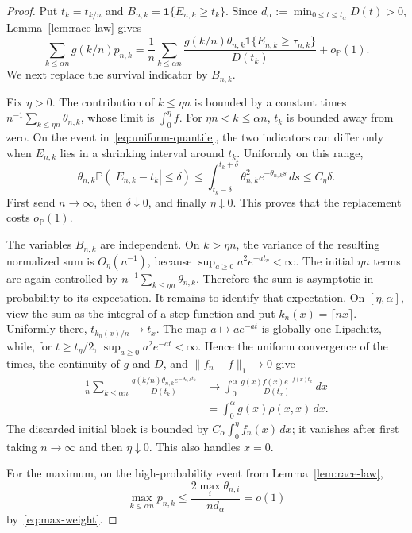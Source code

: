 \documentclass[11pt]{article}
\theoremstyle{remark}
\theoremstyle{plain}
\newcommand{\Pp}{\mathbb P}
\newcommand{\one}{\mathbf 1}
\begin{document}
\begin{proof}
Put $t_k=t_{k/n}$ and $B_{n,k}=\one\{E_{n,k}\ge t_k\}$.  Since
$d_\alpha:=\min_{0\le t\le t_\alpha}D(t)>0$, Lemma~\ref{lem:race-law} gives
\begin{equation}\label{eq:p-first-approx}
 \sum_{k\le\alpha n}g(k/n)p_{n,k}
 =\frac1n\sum_{k\le\alpha n}
 \frac{g(k/n)\theta_{n,k}\one\{E_{n,k}\ge\tau_{n,k}\}}
 {D(t_k)}+o_{\Pp}(1).
\end{equation}
We next replace the survival indicator by $B_{n,k}$.

Fix $\eta>0$.  The contribution of $k\le\eta n$ is bounded by a constant
times $n^{-1}\sum_{k\le\eta n}\theta_{n,k}$, whose limit is
$\int_0^\eta f$.  For $\eta n<k\le\alpha n$, $t_k$ is bounded away from zero.
On the event in~\eqref{eq:uniform-quantile}, the two indicators can differ
only when $E_{n,k}$ lies in a shrinking interval around $t_k$.  Uniformly on
this range,
\[
 \theta_{n,k}\Pp(|E_{n,k}-t_k|\le\delta)
 \le\int_{t_k-\delta}^{t_k+\delta}
       \theta_{n,k}^2e^{-\theta_{n,k}s}\,ds
 \le C_\eta\delta.
\]
First send $n\to\infty$, then $\delta\downarrow0$, and finally
$\eta\downarrow0$.  This proves that the replacement costs $o_{\Pp}(1)$.

The variables $B_{n,k}$ are independent.  On $k>\eta n$, the variance of the
resulting normalized sum is $O_\eta(n^{-1})$, because
$\sup_{a\ge0}a^2e^{-a t_\eta}<\infty$.  The initial $\eta n$ terms are again
controlled by $n^{-1}\sum_{k\le\eta n}\theta_{n,k}$.  Therefore the sum is
asymptotic in probability to its expectation.  It remains to identify that
expectation.  On $[\eta,\alpha]$, view the sum as the integral of a step
function and put $k_n(x)=\lceil nx\rceil$.  Uniformly there,
$t_{k_n(x)/n}\to t_x$.  The map $a\mapsto ae^{-at}$ is globally
one-Lipschitz, while, for $t\ge t_\eta/2$,
$\sup_{a\ge0}a^2e^{-at}<\infty$.  Hence the uniform convergence of the times,
the continuity of $g$ and $D$, and $\lVert f_n-f\rVert_1\to0$ give
\begin{align*}
 \frac1n\sum_{k\le\alpha n}
 \frac{g(k/n)\theta_{n,k}e^{-\theta_{n,k}t_k}}{D(t_k)}
 &\longrightarrow
 \int_0^\alpha
 \frac{g(x)f(x)e^{-f(x)t_x}}{D(t_x)}\,dx\\
 &=\int_0^\alpha g(x)\rho(x,x)\,dx.
\end{align*}
The discarded initial block is bounded by
$C_\alpha\int_0^\eta f_n(x)\,dx$; it vanishes after first taking
$n\to\infty$ and then $\eta\downarrow0$.  This also handles $x=0$.

For the maximum, on the high-probability event from
Lemma~\ref{lem:race-law},
\[
 \max_{k\le\alpha n}p_{n,k}
 \le \frac{2\max_i\theta_{n,i}}{nd_\alpha}=o(1)
\]
by~\eqref{eq:max-weight}.
\end{proof}
\end{document}
